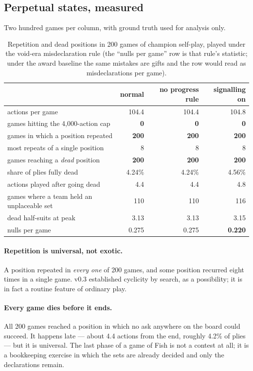 \documentclass[11pt,a4paper]{article}
\begin{document}
\subsection{Perpetual states, measured}
\label{sec:res-perpetual}

Two hundred games per column, with ground truth used for analysis only.

\begin{table}[t]
\centering
\small
\begin{tabular}{lrrr}
\toprule
& normal & no progress rule & signalling on \\
\midrule
actions per game & 104.4 & 104.4 & 104.8 \\
games hitting the 4{,}000-action cap & \textbf{0} & \textbf{0} & \textbf{0} \\
games in which a position repeated & \textbf{200} & \textbf{200} & \textbf{200} \\
most repeats of a single position & 8 & 8 & 8 \\
games reaching a \emph{dead} position & \textbf{200} & \textbf{200} & \textbf{200} \\
share of plies fully dead & 4.24\% & 4.24\% & 4.56\% \\
actions played after going dead & 4.4 & 4.4 & 4.8 \\
games where a team held an unplaceable set & 110 & 110 & 116 \\
dead half-suits at peak & 3.13 & 3.13 & 3.15 \\
nulls per game & 0.275 & 0.275 & \textbf{0.220} \\
\bottomrule
\end{tabular}
\caption{Repetition and dead positions in 200 games of champion self-play,
played under the void-era misdeclaration rule (the ``nulls per game'' row is
that rule's statistic; under the award baseline the same mistakes are gifts
and the row would read as misdeclarations per game).}
\label{tab:perpetual}
\end{table}

\paragraph{Repetition is universal, not exotic.} A position repeated in
\emph{every one} of 200 games, and some position recurred eight times in a
single game. v0.3 established cyclicity by search, as a possibility; it is in
fact a routine feature of ordinary play.

\paragraph{Every game dies before it ends.} All 200 games reached a position in
which no ask anywhere on the board could succeed. It happens late --- about 4.4
actions from the end, roughly 4.2\% of plies --- but it is universal. The last
phase of a game of Fish is not a contest at all; it is a bookkeeping exercise in
which the sets are already decided and only the declarations remain.
\end{document}
